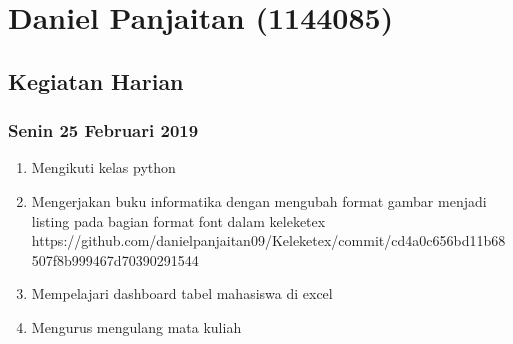 \chapter{Daniel Panjaitan (1144085)}

\section{Kegiatan Harian}
\subsection{Senin 25 Februari 2019}
\begin{enumerate}
  \item Mengikuti kelas python  
  \item Mengerjakan buku informatika dengan mengubah format gambar menjadi listing pada bagian format font dalam keleketex 
  \subitem https://github.com/danielpanjaitan09/Keleketex/commit/cd4a0c656bd11b68507f8b999467d70390291544
  \item Mempelajari dashboard tabel mahasiswa di excel 
  \item Mengurus mengulang mata kuliah
\end{enumerate}